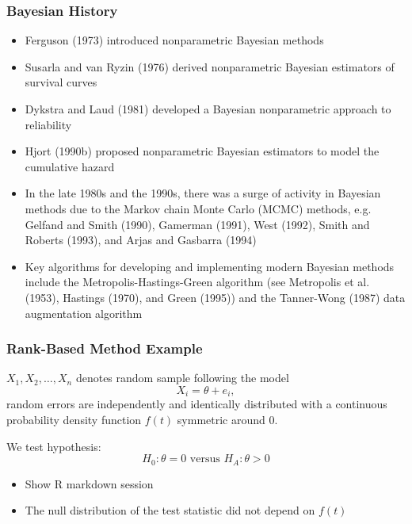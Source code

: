 \documentclass[10pt]{beamer}
\begin{document}
\begin{frame}
\frametitle{Bayesian History}

\begin{itemize}
\item Ferguson (1973) introduced nonparametric Bayesian methods
\item Susarla and van Ryzin (1976) derived nonparametric Bayesian estimators of survival curves
\item Dykstra and Laud (1981) developed a Bayesian nonparametric approach to reliability
\item Hjort (1990b) proposed nonparametric Bayesian estimators to model the cumulative hazard
\item In the late 1980s and the 1990s, there was a surge of activity in Bayesian methods due to the Markov chain Monte Carlo (MCMC) methods, e.g. Gelfand and Smith (1990), Gamerman (1991), West (1992), Smith and Roberts (1993), and Arjas and Gasbarra (1994)
\item Key algorithms for developing and implementing modern Bayesian methods include the Metropolis-Hastings-Green algorithm (see Metropolis et al. (1953), Hastings (1970), and Green (1995)) and the Tanner-Wong (1987) data augmentation algorithm
\end{itemize}

\end{frame}

\begin{frame}
\frametitle{Rank-Based Method Example}

$X_1,X_2,\dots,X_n$ denotes random sample following the model
\[ X_i = \theta + e_i, \]
random errors are independently and identically distributed with a continuous probability density function $f(t)$ symmetric around $0$.

We test hypothesis:
\[ H_0: \theta = 0 \text{ versus } H_A: \theta > 0 \]

\begin{itemize}
\item Show R markdown session
\item The null distribution of the test statistic did not depend on $f(t)$
\end{itemize}

\end{frame}
\end{document}
